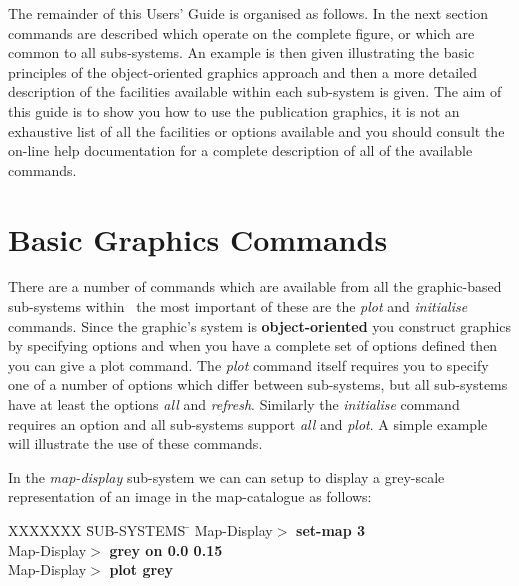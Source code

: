 The remainder of this Users' Guide is organised as follows.  In the
next section commands are described which operate on the complete figure, 
or which are common to all subs-systems.  An example is then given
illustrating the basic principles of the object-oriented graphics
approach and then a more detailed description of the facilities 
available within each sub-system is given.  The aim of this guide is
to show you how to use the publication graphics, it is not an exhaustive
list of all the facilities or options available and you should consult
the on-line help documentation for a complete description of all of
the available commands.

\section{Basic Graphics Commands}

There are a number of commands which are available from all the
graphic-based sub-systems within \Anmap\, the most important of these
are the {\em plot} and {\em initialise} commands.  Since the graphic's
system is {\bf object-oriented} you construct graphics by specifying
options and when you have a complete set of options defined then you
can give a plot command.  The {\em plot} command itself requires you
to specify one of a number of options which differ between sub-systems,
but all sub-systems have at least the options {\em all} and {\em refresh}.
Similarly the {\em initialise} command requires an option and all
sub-systems support {\em all} and {\em plot}.  A simple example will
illustrate the use of these commands.

In the {\em map-display} sub-system we can can setup to display a
grey-scale representation of an image in the map-catalogue as
follows:
\begin{tabbing}
XXXXXXX \= SUB-SYSTEMS \= \kill
\> Map-Display$>$ \> {\bf set-map 3} \\
\> Map-Display$>$ \> {\bf grey on 0.0 0.15} \\
\> Map-Display$>$ \> {\bf plot grey} \\
\end{tabbing}

